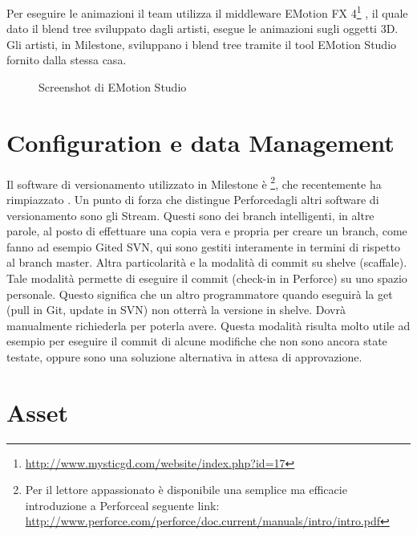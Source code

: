 Per eseguire le animazioni il team utilizza il middleware EMotion FX 4\footnote{\url{http://www.mysticgd.com/website/index.php?id=17}} , il quale dato il blend tree sviluppato dagli artisti, esegue le animazioni sugli oggetti 3D. Gli artisti, in Milestone, sviluppano i blend tree tramite il tool EMotion Studio fornito dalla stessa casa.

\begin{figure}
	\centering
	\caption{Screenshot di EMotion Studio}
	\label{fig:screenshot-emotion-studio}
\end{figure}

\section{Configuration e data Management}

Il software di versionamento utilizzato in Milestone è \footnote{Per il lettore appassionato è disponibile una semplice ma efficacie introduzione a Perforce\textregistered al seguente link: \url{http://www.perforce.com/perforce/doc.current/manuals/intro/intro.pdf}}, che recentemente ha rimpiazzato . Un punto di forza che distingue Perforce\textregistered dagli altri software di versionamento sono gli Stream. Questi sono dei branch intelligenti, in altre parole, al posto di effettuare una copia vera e propria per creare un branch, come fanno ad esempio Git\textregistered ed SVN\textregistered, qui sono gestiti interamente in termini di  rispetto al branch master. Altra particolarità e la modalità di commit su shelve (scaffale). Tale modalità permette di eseguire il commit (check-in in Perforce\textregistered) su uno spazio personale. Questo significa che un altro programmatore quando eseguirà la get (pull in Git\textregistered, update in SVN\textregistered) non otterrà la versione in shelve. Dovrà manualmente richiederla per poterla avere. Questa modalità risulta molto utile ad esempio per eseguire il commit di alcune modifiche che non sono ancora state testate, oppure sono una soluzione alternativa in attesa di approvazione.

\section{Asset}
\label{sec:asset}

